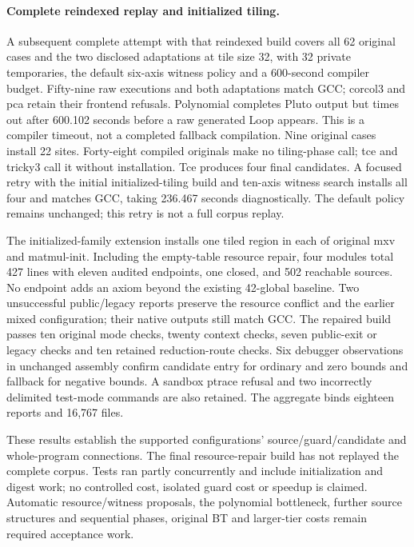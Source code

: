 \paragraph{Complete reindexed replay and initialized tiling.}
A subsequent complete attempt with that reindexed build covers all 62 original
cases and the two disclosed adaptations at tile size 32, with 32 private
temporaries, the default six-axis witness policy and a 600-second compiler
budget. Fifty-nine raw executions and both adaptations match GCC; corcol3 and
pca retain their frontend refusals. Polynomial completes Pluto output but
times out after 600.102 seconds before a raw generated Loop appears. This is
a compiler timeout, not a completed fallback compilation. Nine original cases
install 22 sites. Forty-eight compiled originals make no tiling-phase call;
tce and tricky3 call it without installation. Tce produces four final candidates.
A focused retry with the initial initialized-tiling build and ten-axis witness
search installs all four and matches GCC, taking 236.467 seconds diagnostically.
The default policy remains unchanged; this retry is not a full corpus replay.

The initialized-family extension installs one tiled region in each of original
mxv and matmul-init. Including the empty-table resource repair, four modules
total 427 lines with eleven audited endpoints, one closed, and 502 reachable
sources. No endpoint adds an axiom beyond the existing 42-global baseline.
Two unsuccessful public/legacy reports preserve the resource conflict and
the earlier mixed configuration; their native outputs still match GCC.
The repaired build passes ten original mode checks, twenty context checks,
seven public-exit or legacy checks and ten retained reduction-route checks.
Six debugger observations in unchanged assembly confirm candidate entry for
ordinary and zero bounds and fallback for negative bounds. A sandbox ptrace
refusal and two incorrectly delimited test-mode commands are also retained.
The aggregate binds eighteen reports and 16,767 files.

These results establish the supported configurations' source/guard/candidate
and whole-program connections. The final resource-repair build has not replayed
the complete corpus. Tests ran partly concurrently and include initialization
and digest work; no controlled cost, isolated guard cost or speedup is claimed.
Automatic resource/witness proposals, the polynomial bottleneck, further source
structures and sequential phases, original BT and larger-tier costs remain
required acceptance work.

